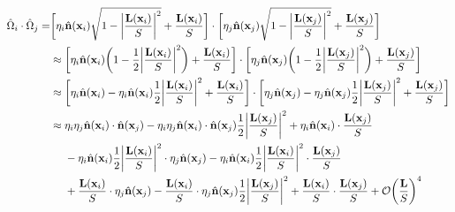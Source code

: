 \begin{equation}
    \begin{split}
        \hat{\Omega}_i \cdot \hat{\Omega}_j = &
        \bigg[ \eta_i \hat{{\bf n}}({\bf x}_i) \sqrt{1 - \bigg|\frac{{\bf L}({\bf x}_i)}{S}\bigg|^2} + \frac{{\bf L}({\bf x}_i)}{S}\bigg] \cdot \bigg[ \eta_j \hat{{\bf n}}({\bf x}_j) \sqrt{1 - \bigg|\frac{{\bf L}({\bf x}_j)}{S}\bigg|^2} + \frac{{\bf L}({\bf x}_j)}{S}\bigg] \\
        & \approx 
        \bigg[ \eta_i \hat{{\bf n}}({\bf x}_i)
        \bigg(
        1 - \frac{1}{2} \bigg|\frac{{\bf L}({\bf x}_i)}{S}\bigg|^2\bigg) + \frac{{\bf L}({\bf x}_i)}{S}\bigg] \cdot 
        \bigg[ \eta_j \hat{{\bf n}}({\bf x}_j)
        \bigg(
        1 - \frac{1}{2} \bigg|\frac{{\bf L}({\bf x}_j)}{S}\bigg|^2 \bigg) + \frac{{\bf L}({\bf x}_j)}{S}
        \bigg] \\
        & \approx 
        \bigg[ \eta_i \hat{{\bf n}}({\bf x}_i)
        - \eta_i \hat{{\bf n}}({\bf x}_i) \frac{1}{2} \bigg|\frac{{\bf L}({\bf x}_i)}{S}\bigg|^2 + \frac{{\bf L}({\bf x}_i)}{S}\bigg] \cdot 
        \bigg[ \eta_j \hat{{\bf n}}({\bf x}_j) - \eta_j \hat{{\bf n}}({\bf x}_j) \frac{1}{2} \bigg|\frac{{\bf L}({\bf x}_j)}{S}\bigg|^2 + \frac{{\bf L}({\bf x}_j)}{S}
        \bigg] \\
        &\approx \eta_i \eta_j \hat{{\bf n}}({\bf x}_i) \cdot \hat{{\bf n}}({\bf x}_j) - \eta_i \eta_j \hat{{\bf n}}({\bf x}_i) \cdot \hat{{\bf n}}({\bf x}_j) \frac{1}{2} \bigg|\frac{{\bf L}({\bf x}_j)}{S}\bigg|^2 + \eta_i \hat{{\bf n}}({\bf x}_i) \cdot \frac{{\bf L}({\bf x}_j)}{S} \\
        & \textnormal{ } \textnormal{ } \textnormal{ } \textnormal{ } 
        - \eta_i \hat{{\bf n}}({\bf x}_i) \frac{1}{2} \bigg|\frac{{\bf L}({\bf x}_i)}{S}\bigg|^2 \cdot \eta_j \hat{{\bf n}}({\bf x}_j) 
        - \eta_i \hat{{\bf n}}({\bf x}_i) \frac{1}{2} \bigg|\frac{{\bf L}({\bf x}_i)}{S}\bigg|^2 \cdot \frac{{\bf L}({\bf x}_j)}{S} \\
        & \textnormal{ } \textnormal{ } \textnormal{ } \textnormal{ } + \frac{{\bf L}({\bf x}_i)}{S} \cdot \eta_j \hat{{\bf n}}({\bf x}_j) 
        - \frac{{\bf L}({\bf x}_i)}{S} \cdot \eta_j \hat{{\bf n}}({\bf x}_j) \frac{1}{2} \bigg|\frac{{\bf L}({\bf x}_j)}{S}\bigg|^2
        + \frac{{\bf L}({\bf x}_i)}{S} \cdot  \frac{{\bf L}({\bf x}_j)}{S} + \mathcal{O}\bigg(\frac{{\bf L}}{S}\bigg)^4 \\
    \end{split}
\end{equation}

